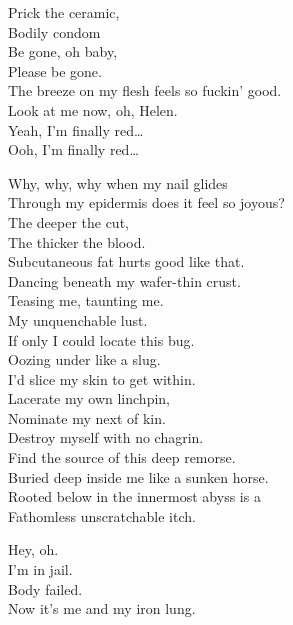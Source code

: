 Prick the ceramic, \\
Bodily condom \\
Be gone, oh baby, \\
Please be gone. \\
The breeze on my flesh feels so fuckin' good. \\
Look at me now, oh, Helen. \\
Yeah, I'm finally red… \\
Ooh, I'm finally red… \\


Why, why, why when my nail glides \\
Through my epidermis does it feel so joyous? \\
The deeper the cut, \\
The thicker the blood. \\
Subcutaneous fat hurts good like that. \\
Dancing beneath my wafer-thin crust. \\
Teasing me, taunting me. \\
My unquenchable lust. \\

If only I could locate this bug. \\
Oozing under like a slug. \\
I'd slice my skin to get within. \\
Lacerate my own linchpin, \\
Nominate my next of kin. \\
Destroy myself with no chagrin. \\
Find the source of this deep remorse. \\
Buried deep inside me like a sunken horse. \\
Rooted below in the innermost abyss is a \\
Fathomless unscratchable itch. \\





Hey, oh. \\
I'm in jail. \\
Body failed. \\
Now it's me and my iron lung. \\

